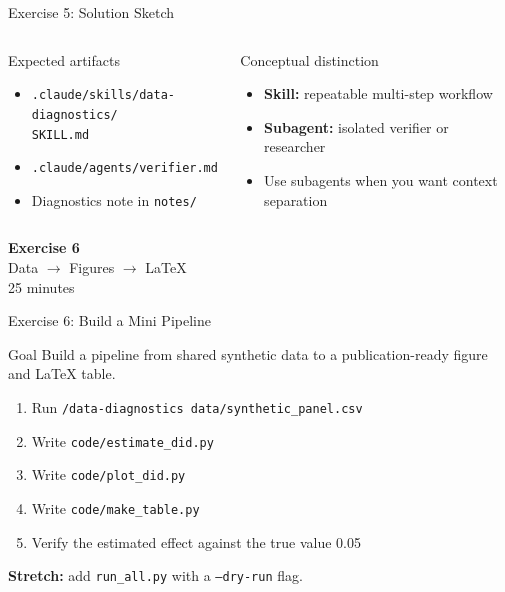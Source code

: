 \documentclass[aspectratio=169,10pt]{beamer}
\begin{document}
\begin{frame}{Exercise 5: Solution Sketch}
\small
\begin{columns}[T]
\begin{exampleblock}{Expected artifacts}
\begin{itemize}\itemsep1pt
    \item \texttt{.claude/skills/data-diagnostics/}\\
    \texttt{SKILL.md}
    \item \texttt{.claude/agents/verifier.md}
    \item Diagnostics note in \texttt{notes/}
\end{itemize}
\end{exampleblock}

\begin{alertblock}{Conceptual distinction}
\begin{itemize}\itemsep1pt
    \item \textbf{Skill:} repeatable multi-step workflow
    \item \textbf{Subagent:} isolated verifier or researcher
    \item Use subagents when you want context separation
\end{itemize}
\end{alertblock}
\end{columns}
\end{frame}

\begin{frame}{}
\vfill\begin{center}{\Huge \textcolor{uzhblue}{\textbf{Exercise 6}}}\\[12pt]
{\LARGE Data $\to$ Figures $\to$ LaTeX}\\[6pt]{\small 25 minutes}\end{center}\vfill
\end{frame}

\begin{frame}[fragile]{Exercise 6: Build a Mini Pipeline}
\begin{exampleblock}{Goal}
Build a pipeline from shared synthetic data to a publication-ready figure and
LaTeX table.
\end{exampleblock}
\scriptsize
\begin{enumerate}\itemsep2pt
    \item Run \texttt{/data-diagnostics data/synthetic\_panel.csv}
    \item Write \texttt{code/estimate\_did.py}
    \item Write \texttt{code/plot\_did.py}
    \item Write \texttt{code/make\_table.py}
    \item Verify the estimated effect against the true value 0.05
\end{enumerate}

\textbf{Stretch:} add \texttt{run\_all.py} with a \texttt{--dry-run} flag.
\end{frame}
\end{document}
